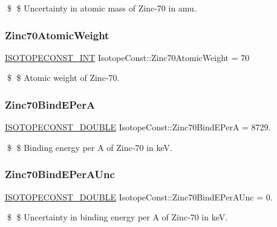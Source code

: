 \$ \$ Uncertainty in atomic mass of Zinc-\/70 in amu. \mbox{\label{group___isotope_const-_zinc-_zn70_gaebfb1fbb864b2472699673e14c8484aa}} 
\subsubsection{\texorpdfstring{Zinc70\+Atomic\+Weight}{Zinc70AtomicWeight}}
{\footnotesize\ttfamily \mbox{\hyperlink{group___isotope_const-_macros_ga5f18360b3e99483a35c32d789e62621c}{I\+S\+O\+T\+O\+P\+E\+C\+O\+N\+S\+T\+\_\+\+I\+NT}} Isotope\+Const\+::\+Zinc70\+Atomic\+Weight = 70}

\$ \$ Atomic weight of Zinc-\/70. \mbox{\label{group___isotope_const-_zinc-_zn70_ga5bc276536575eb1baa547438076ab6cc}} 
\subsubsection{\texorpdfstring{Zinc70\+Bind\+E\+PerA}{Zinc70BindEPerA}}
{\footnotesize\ttfamily \mbox{\hyperlink{group___isotope_const-_macros_ga8f45a7272ce02c0b4c65c44636ed719a}{I\+S\+O\+T\+O\+P\+E\+C\+O\+N\+S\+T\+\_\+\+D\+O\+U\+B\+LE}} Isotope\+Const\+::\+Zinc70\+Bind\+E\+PerA = 8729.}

\$ \$ Binding energy per A of Zinc-\/70 in keV. \mbox{\label{group___isotope_const-_zinc-_zn70_ga49336320ebf940e23404dfb0da61e84f}} 
\subsubsection{\texorpdfstring{Zinc70\+Bind\+E\+Per\+A\+Unc}{Zinc70BindEPerAUnc}}
{\footnotesize\ttfamily \mbox{\hyperlink{group___isotope_const-_macros_ga8f45a7272ce02c0b4c65c44636ed719a}{I\+S\+O\+T\+O\+P\+E\+C\+O\+N\+S\+T\+\_\+\+D\+O\+U\+B\+LE}} Isotope\+Const\+::\+Zinc70\+Bind\+E\+Per\+A\+Unc = 0.}

\$ \$ Uncertainty in binding energy per A of Zinc-\/70 in keV. \mbox{\label{group___isotope_const-_zinc-_zn70_ga7af42d564f7b8179114b3ca371467f81}} 
